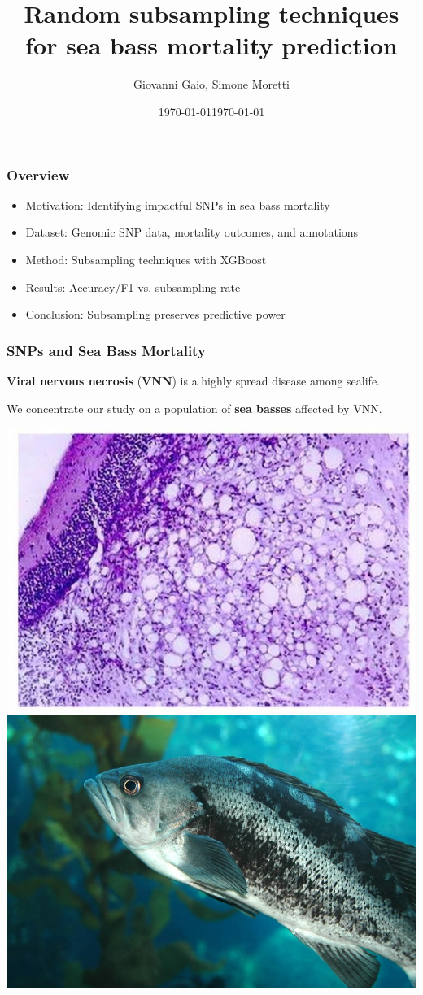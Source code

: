 \documentclass[aspectratio=169]{beamer}
\title{Random subsampling techniques for sea bass mortality prediction}
\author{Giovanni Gaio, Simone Moretti}
\date{\today}
\subtitle{}
\date{\today}
\begin{document}
\frame{\titlepage}

\begin{frame}
\frametitle{Overview}
\begin{itemize}
  \item Motivation: Identifying impactful SNPs in sea bass mortality
  \item Dataset: Genomic SNP data, mortality outcomes, and annotations
  \item Method: Subsampling techniques with XGBoost
  \item Results: Accuracy/F1 vs. subsampling rate
  \item Conclusion: Subsampling preserves predictive power
\end{itemize}
\end{frame}

\begin{frame}
\frametitle{SNPs and Sea Bass Mortality}
\begin{minipage}{0.45\textwidth}
  \textbf{Viral nervous necrosis} (\textbf{VNN}) is a highly spread disease among sealife.

  \vspace{2cm}

  We concentrate our study on a population of \textbf{sea basses} affected by VNN.
\end{minipage}

\begin{minipage}{0.45\textwidth}
    \includegraphics[width=0.6\linewidth]{figures/VNN.jpg}
    \includegraphics[width=0.6\linewidth]{figures/Black-Sea-Bass-303435837.jpg}
\end{minipage}
  
\end{frame}
\end{document}
